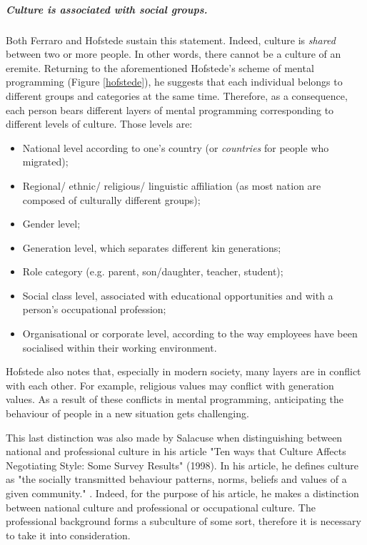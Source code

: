\documentclass[../main.tex]{subfiles}
\begin{document}
\subparagraph*{Culture is associated with social groups.} Both Ferraro and Hofstede sustain this statement. Indeed, culture is \textit{shared} between two or more people. In other words, there cannot be a culture of an eremite. Returning to the aforementioned Hofstede's scheme of mental programming (Figure \ref{hofstede}), he suggests that each individual belongs to different groups and categories at the same time. Therefore, as a consequence, each person bears different layers of mental programming corresponding to different levels of culture. Those levels are:
\begin{itemize}
\item National level according to one's country (or \textit{countries} for people who migrated);
\item Regional/ ethnic/ religious/ linguistic affiliation (as most nation are composed of culturally different groups);
\item Gender level;
\item Generation level, which separates different kin generations;
\item Role category (e.g. parent, son/daughter, teacher, student);
\item Social class level, associated with educational opportunities and with a person's occupational profession;
\item Organisational or corporate level, according to the way employees have been socialised within their working environment. \autocite[18]{hofstede}
\end{itemize}
Hofstede also notes that, especially in modern society, many layers are in conflict with each other. For example, religious values may conflict with generation values. As a result of these conflicts in mental programming, anticipating the behaviour of people in a new situation gets challenging.

This last distinction was also made by Salacuse %
when distinguishing between national and professional culture in his article "Ten ways that Culture Affects Negotiating Style: Some Survey Results" (1998). In his article, he defines culture as "the socially transmitted behaviour patterns, norms, beliefs and values of a given community." \autocite[222]{salacuse}. Indeed, for the purpose of his article, he makes a distinction between national culture and professional or occupational culture. The professional %
background forms a subculture of some sort, therefore it is necessary to take it into consideration.
\end{document}
